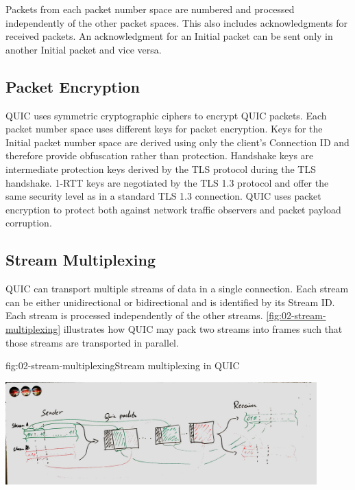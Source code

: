 Packets from each packet number space are numbered and processed independently of the other packet
spaces. This also includes acknowledgments for received packets. An acknowledgment for an Initial
packet can be sent only in another Initial packet and vice versa.

\subsection{Packet Encryption}

QUIC uses symmetric cryptographic ciphers to encrypt QUIC packets. Each packet number space uses
different keys for packet encryption. Keys for the Initial packet number space are derived using
only the client's Connection ID and therefore provide obfuscation rather than protection. Handshake
keys are intermediate protection keys derived by the TLS protocol during the TLS handshake. 1-RTT
keys are negotiated by the TLS 1.3 protocol and offer the same security level as in a standard TLS
1.3 connection. QUIC uses packet encryption to protect both against network traffic observers and
packet payload corruption.

\subsection{Stream Multiplexing}

QUIC can transport multiple streams of data in a single connection. Each stream can be either
unidirectional or bidirectional and is identified by its Stream ID. Each stream is processed
independently of the other streams. \autoref{fig:02-stream-multiplexing} illustrates how QUIC may
pack two streams into frames such that those streams are transported in parallel.

\begin{myFigure}{fig:02-stream-multiplexing}{Stream multiplexing in QUIC}

\includegraphics[width=0.9\textwidth]{img/02-stream-multiplexing}

\end{myFigure}


